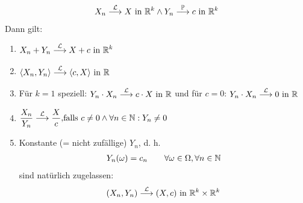 \begin{beispiel}\label{beisp4.18}
\begin{align*}
X_n\stackrel{\mathcal{L}}{\longrightarrow} X\text{ in }\mathbb{R}^k\wedge Y_n\stackrel{\mathbb{P}}{\longrightarrow} c\text{ in }\mathbb{R}^k
\end{align*}
Dann gilt:
\begin{enumerate}[label=(\arabic*)]
\item $\begin{aligned}
X_n+Y_n\stackrel{\mathcal{L}}{\longrightarrow} X+c\text{ in }\mathbb{R}^k
\end{aligned}$
\item $\begin{aligned}
\langle X_n,Y_n\rangle\stackrel{\mathcal{L}}{\longrightarrow}\langle c,X\rangle\text{ in }\mathbb{R}
\end{aligned}$
\item Für $k=1$ speziell:
$\begin{aligned}
Y_n\cdot X_n\stackrel{\mathcal{L}}{\longrightarrow}c\cdot X\text{ in }\mathbb{R}
\end{aligned}$ und für $c=0$:
$\begin{aligned}
Y_n\cdot X_n\stackrel{\mathcal{L}}{\longrightarrow}0\text{ in }\mathbb{R}
\end{aligned}$
\item $\begin{aligned}
\frac{X_n}{Y_n}\stackrel{\mathcal{L}}{\longrightarrow} \frac{X}{c},&\text{falls } c\neq0\wedge\forall n\in\mathbb{N}:Y_n\neq0
\end{aligned}$
\item Konstante (= nicht zufällige) $Y_n$, d. h.
\begin{align*}
Y_n(\omega)=c_n\qquad\forall\omega\in\Omega,\forall n\in\mathbb{N}
\end{align*}
sind natürlich zugelassen:
\begin{align*}
(X_n,Y_n)\stackrel{\mathcal{L}}{\longrightarrow}(X,c)\text{ in }\mathbb{R}^k\times\mathbb{R}^k
\end{align*}
\end{enumerate}
\end{beispiel}

